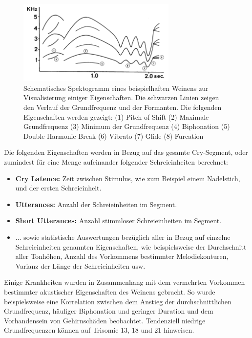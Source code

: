 \begin{figure}[H]
	\centering
	\includegraphics[width=0.7\textwidth]{bilder/melodyTypes.png}
	\caption[Schematisches Spektogramm eines beispielhaften Weinens]{Schematisches Spektogramm eines beispielhaften Weinens zur Visualisierung einiger Eigenschaften. Die schwarzen Linien zeigen  den Verlauf der Grundfrequenz und der Formanten. Die folgenden Eigenschaften werden gezeigt: (1) Pitch of Shift (2) Maximale Grundfrequenz (3) Minimum der Grundfrequenz (4) Biphonation (5) Double Harmonic Break (6) Vibrato (7) Glide (8) Furcation \cite[S. 142]{signal}}
	\label{img:cryMelodies}
\end{figure}

Die folgenden Eigenschaften werden in Bezug auf das gesamte Cry-Segment, oder zumindest für eine Menge aufeinander folgender Schreieinheiten berechnet:

\begin{itemize}
	\item \textbf{Cry Latence: } Zeit zwischen Stimulus, wie zum Beispiel einem Nadelstich, und der ersten Schreieinheit.
	\item \textbf{Utterances: } Anzahl der Schreieinheiten im Segment.
	\item \textbf{Short Utterances: } Anzahl stimmloser Schreieinheiten im Segment.
	\item ... sowie statistische Auswertungen bezüglich aller in Bezug auf einzelne Schreieinheiten genannten Eigenschaften, wie beispielsweise der Durchschnitt aller Tonhöhen, Anzahl des Vorkommens bestimmter Melodiekonturen, Varianz der Länge der Schreieinheiten usw.\cite[S. 85]{parentalPerception}
\end{itemize}

Einige Krankheiten wurden in Zusammenhang mit dem vermehrten Vorkommen bestimmter akustischer Eigenschaften des Weinens gebracht. So wurde beispielsweise eine Korrelation zwischen dem Anstieg der durchschnittlichen Grundfrequenz, häufiger Biphonation und geringer Duration und dem Vorhandensein von Gehirnschäden beobachtet. Tendenziell niedrige Grundfrequenzen können auf Trisomie 13, 18 und 21 hinweisen.\cite[S. 85]{parentalPerception}

